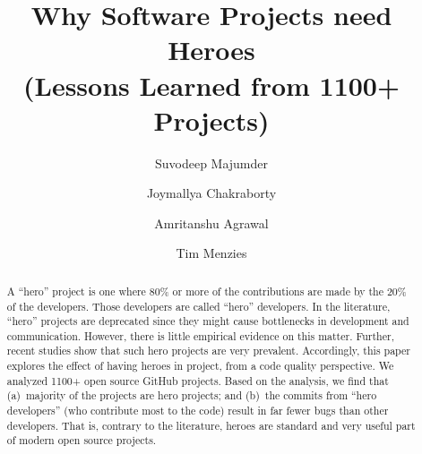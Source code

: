\documentclass[sigconf,review]{acmart}
\begin{document}
\title{Why Software Projects need Heroes\\(Lessons Learned from 1100+ Projects)}

\author{Suvodeep Majumder}

\author{Joymallya Chakraborty}

\author{Amritanshu Agrawal}

\author{Tim Menzies}



\renewcommand{\shortauthors}{Majumder et al.}

\begin{abstract}
  A ``hero'' project is one where  80\% or more of the contributions are made by the 20\% of the developers. Those developers are called ``hero'' developers. In the literature, ``hero''  projects are  deprecated since they might   cause bottlenecks 
in development and communication. However, there is little empirical evidence on this matter.
Further, recent studies show that such hero projects are very prevalent.
Accordingly, 
this paper explores the effect of having heroes in project, from a code quality perspective. 
We analyzed  1100+ open source GitHub projects. Based on the analysis,
we find that   (a)~majority of the projects are hero projects;  and (b)~the
commits from ``hero developers'' (who
contribute most to the code) result in far fewer bugs than other developers.  That is,
contrary
to the literature, 
heroes are standard and very useful  part of modern open source projects.
\end{abstract}
\end{document}
